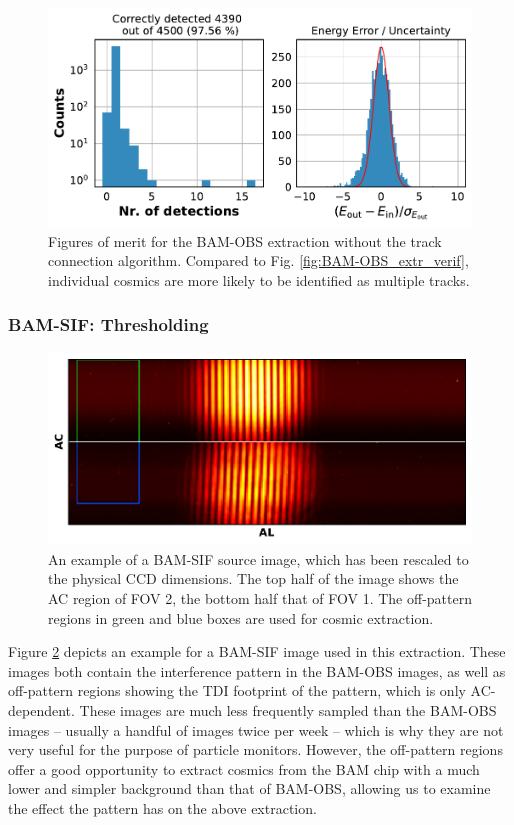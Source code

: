 \documentclass[a4paper, 11pt]{article}
\begin{document}
\begin{figure}
  \centering
    \includegraphics[width=\textwidth]{images/extraction/verification_bam-obs_old}
    \caption{Figures of merit for the BAM-OBS extraction without the track connection algorithm. Compared to Fig. \ref{fig:BAM-OBS_extr_verif}, individual cosmics are more likely to be identified as multiple tracks.}
  \label{fig:BAM-OBS_nomend_extr_verif}
\end{figure}


\subsubsection{BAM-SIF: Thresholding}
\label{sec:extrBAM-SIF}
\begin{figure}
  \centering
  \includegraphics{images/extraction/BAM-SIF_full_image}
  \caption{An example of a BAM-SIF source image, which has been rescaled to the physical CCD dimensions. The top half of the image shows the AC region of FOV 2, the bottom half that of FOV 1. The off-pattern regions in green and blue boxes are used for cosmic extraction.}
  \label{fig:BAM-SIF_full}
\end{figure}

Figure \ref{fig:BAM-SIF_full} depicts an example for a BAM-SIF image used in this extraction. These images both contain the interference pattern in the BAM-OBS images, as well as off-pattern regions showing the TDI footprint of the pattern, which is only AC-dependent. These images are much less frequently sampled than the BAM-OBS images -- usually a handful of images twice per week -- which is why they are not very useful for the purpose of particle monitors. However, the off-pattern regions offer a good opportunity to extract cosmics from the BAM chip with a much lower and simpler background than that of BAM-OBS, allowing us to examine the effect the pattern has on the above extraction.
\end{document}
